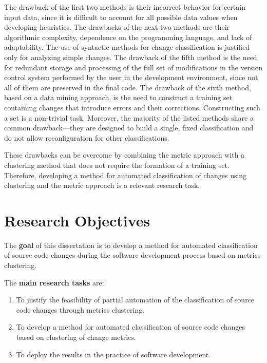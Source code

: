 \documentclass[11pt,a4paper]{article}
\begin{document}
The drawback of the first two methods is their incorrect behavior for certain input data, since it is difficult to account for all possible data values when developing heuristics. The drawbacks of the next two methods are their algorithmic complexity, dependence on the programming language, and lack of adaptability. The use of syntactic methods for change classification is justified only for analyzing simple changes. The drawback of the fifth method is the need for redundant storage and processing of the full set of modifications in the version control system performed by the user in the development environment, since not all of them are preserved in the final code. The drawback of the sixth method, based on a data mining approach, is the need to construct a training set containing changes that introduce errors and their corrections. Constructing such a set is a non-trivial task. Moreover, the majority of the listed methods share a common drawback---they are designed to build a single, fixed classification and do not allow reconfiguration for other classifications.

These drawbacks can be overcome by combining the metric approach with a clustering method that does not require the formation of a training set. Therefore, developing a method for automated classification of changes using clustering and the metric approach is a relevant research task.

\section{Research Objectives}
\label{sec:objectives}

The \textbf{goal} of this dissertation is to develop a method for automated classification of source code changes during the software development process based on metrics clustering.

The \textbf{main research tasks} are:

\begin{enumerate}
    \item To justify the feasibility of partial automation of the classification of source code changes through metrics clustering.
    \item To develop a method for automated classification of source code changes based on clustering of change metrics.
    \item To deploy the results in the practice of software development.
\end{enumerate}
\end{document}

